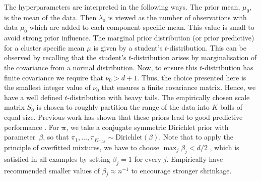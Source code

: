 \documentclass[12pt,english]{article}
\begin{document}
{The hyperparameters are interpreted in the following ways. The prior mean, $\mu_0$, is the mean of the data. Then $\lambda_0$ is viewed as the number of observations with data $\mu_0$ which are added to each component specific mean. This value is small to avoid strong prior influence. The marginal prior distribution (or prior predictive) for a cluster specific mean $\mu$ is given by a student's $t$-distribution. This can be observed by recalling that the student's $t$-distribution arises by marginalisation of the covariance from a normal distribution. Now, to ensure this $t$-distribution has finite covariance we require that $\nu_0 > d + 1$. Thus, the choice presented here is the smallest integer value of $\nu_0$ that ensures a finite covariance matrix. Hence, we have a well defined $t$-distribution with heavy tails. The empirically chosen scale matrix $S_0$ is chosen to roughly partition the range of the data into $K$ balls of equal size. Previous work has shown that these priors lead to good predictive performance \citep{Crook:2018}. For $\boldsymbol{\pi}$, we take a conjugate symmetric Dirichlet prior with parameter~$\beta$, so that $\pi_1, \ldots, \pi_{K_{max}} \sim \mbox{Dirichlet}(\beta)$. Note that to apply the principle of overfitted mixtures, we have to choose $\max_j\beta_j < d/2$  \citep{Rousseau::2011}, which is satisfied in all examples by setting $\beta_j = 1$ for every $j$. Empirically \citet{Van::2015} have recommended smaller values of $\beta_j \approx n^{-1}$ to encourage stronger shrinkage.
}
\end{document}
